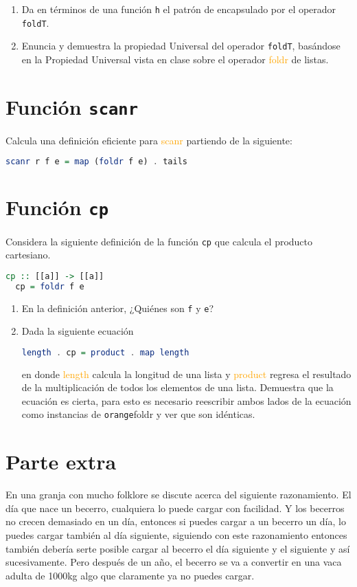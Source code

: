\documentclass[spanish,12pt,letterpaper]{article}
\begin{document}
\begin{enumerate}
\item Da en términos de una función \texttt{h} el patrón de encapsulado por el
  operador \texttt{foldT}.
  
\item Enuncia y demuestra la propiedad Universal del operador \texttt{foldT},
  basándose en la Propiedad Universal vista en clase sobre el operador
  \textcolor{orange}{foldr} de listas.
\end{enumerate}

\section{Función \texttt{scanr}}
Calcula una definición eficiente para \textcolor{orange}{scanr} partiendo de la
siguiente:

\begin{lstlisting}[language=Haskell]
  scanr r f e = map (foldr f e) . tails
\end{lstlisting}

\section{Función \texttt{cp}}
Considera la siguiente definición de la función \texttt{cp} que calcula el
producto cartesiano.

\begin{lstlisting}[language=Haskell]
  cp :: [[a]] -> [[a]]
  cp = foldr f e
\end{lstlisting}

\begin{enumerate}
\item En la definición anterior, ¿Quiénes son \texttt{f} y \texttt{e}?
\item Dada la siguiente ecuación
  \begin{lstlisting}[language=Haskell]
    length . cp = product . map length
  \end{lstlisting}
  en donde \textcolor{orange}{length} calcula la longitud de una lista y
  \textcolor{orange}{product} regresa el resultado de la multiplicación de todos
  los elementos de una lista. Demuestra que la ecuación es cierta, para esto es
  necesario reescribir ambos lados de la ecuación como instancias de \texttt
  {orange}{foldr} y ver que son idénticas.
\end{enumerate}

\section{Parte extra}
En una granja con mucho folklore se discute acerca del siguiente
razonamiento.  El día que nace un becerro, cualquiera lo puede cargar con
facilidad.  Y los becerros no crecen demasiado en un día,  entonces si puedes
cargar a un becerro un día,  lo puedes cargar también al día siguiente,
siguiendo con este razonamiento entonces también debería serte posible cargar al
becerro el día siguiente y el siguiente y así sucesivamente. Pero después de un
año, el becerro se va a convertir en una vaca adulta de 1000kg algo que
claramente ya no puedes cargar.
\end{document}
